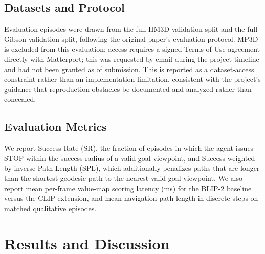 \documentclass[conference]{IEEEtran}
\begin{document}
\subsection{Datasets and Protocol}
Evaluation episodes were drawn from the full HM3D validation split and the full Gibson validation split, following the original paper's evaluation protocol. MP3D is excluded from this evaluation: access requires a signed Terms-of-Use agreement directly with Matterport; this was requested by email during the project timeline and had not been granted as of submission. This is reported as a dataset-access constraint rather than an implementation limitation, consistent with the project's guidance that reproduction obstacles be documented and analyzed rather than concealed.

\subsection{Evaluation Metrics}
We report Success Rate (SR), the fraction of episodes in which the agent issues STOP within the success radius of a valid goal viewpoint, and Success weighted by inverse Path Length (SPL), which additionally penalizes paths that are longer than the shortest geodesic path to the nearest valid goal viewpoint. We also report mean per-frame value-map scoring latency (ms) for the BLIP-2 baseline versus the CLIP extension, and mean navigation path length in discrete steps on matched qualitative episodes.

\section{Results and Discussion}

\begin{table}[t]
\centering
\caption{Baseline Reproduction vs. Paper-Reported Results}
\label{tab:results}
\end{table}
\end{document}
